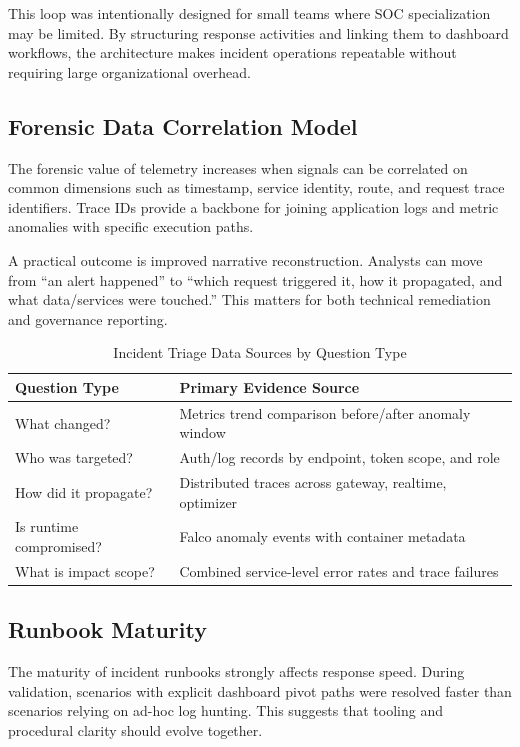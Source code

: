 \documentclass[conference]{IEEEtran}
\begin{document}
This loop was intentionally designed for small teams where SOC specialization may be limited. By structuring response activities and linking them to dashboard workflows, the architecture makes incident operations repeatable without requiring large organizational overhead.

\subsection{Forensic Data Correlation Model}
The forensic value of telemetry increases when signals can be correlated on common dimensions such as timestamp, service identity, route, and request trace identifiers. Trace IDs provide a backbone for joining application logs and metric anomalies with specific execution paths.

A practical outcome is improved narrative reconstruction. Analysts can move from ``an alert happened'' to ``which request triggered it, how it propagated, and what data/services were touched.'' This matters for both technical remediation and governance reporting.

\begin{table}[!t]
\caption{Incident Triage Data Sources by Question Type}
\centering
\footnotesize
\begin{tabularx}{\linewidth}{>{\raggedright\arraybackslash}p{1.2cm} Y}
\toprule
Question Type & Primary Evidence Source \\
\midrule
What changed? & Metrics trend comparison before/after anomaly window \\
Who was targeted? & Auth/log records by endpoint, token scope, and role \\
How did it propagate? & Distributed traces across gateway, realtime, optimizer \\
Is runtime compromised? & Falco anomaly events with container metadata \\
What is impact scope? & Combined service-level error rates and trace failures \\
\bottomrule
\end{tabularx}
\label{tab:triagequestions}
\end{table}

\subsection{Runbook Maturity}
The maturity of incident runbooks strongly affects response speed. During validation, scenarios with explicit dashboard pivot paths were resolved faster than scenarios relying on ad-hoc log hunting. This suggests that tooling and procedural clarity should evolve together.
\end{document}
